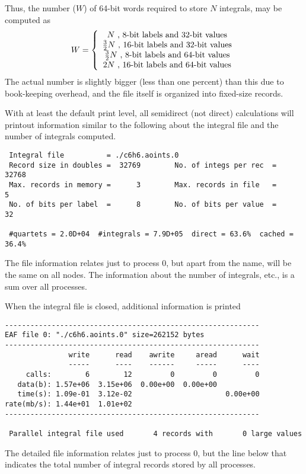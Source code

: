 Thus, the number ($W$) of 64-bit words required to store $N$ integrals,
may be computed as
\begin{displaymath}
  W = \left\{ \\
      \begin{array}{c}
        N \mbox{ , 8-bit labels and 32-bit values} \\
        \frac{3}{2}N \mbox{ , 16-bit labels and 32-bit values} \\
        \frac{3}{2}N \mbox{ , 8-bit labels and 64-bit values} \\
        2N \mbox{ , 16-bit labels and 64-bit values} 
      \end{array}
      \right.
\end{displaymath}
The actual number is slightly bigger (less than one percent) than this
due to book-keeping overhead, and the file itself is organized into
fixed-size records.

With at least the default print level, all semidirect (not direct)
calculations will printout information similar to the following about
the integral file and the number of integrals computed.
\begin{verbatim}
 Integral file          = ./c6h6.aoints.0
 Record size in doubles =  32769        No. of integs per rec  =  32768
 Max. records in memory =      3        Max. records in file   =      5
 No. of bits per label  =      8        No. of bits per value  =     32

 #quartets = 2.0D+04  #integrals = 7.9D+05  direct = 63.6%  cached = 36.4%
\end{verbatim}
The file information relates just to process 0, but apart from the
name, will be the same on all nodes.  The information about the number
of integrals, etc., is a sum over all processes.

When the integral file is closed, additional information is printed
\begin{verbatim}
------------------------------------------------------------
EAF file 0: "./c6h6.aoints.0" size=262152 bytes
------------------------------------------------------------
               write      read    awrite     aread      wait
               -----      ----    ------     -----      ----
     calls:        6        12         0         0         0
   data(b): 1.57e+06  3.15e+06  0.00e+00  0.00e+00
   time(s): 1.09e-01  3.12e-02                      0.00e+00
rate(mb/s): 1.44e+01  1.01e+02
------------------------------------------------------------

 Parallel integral file used       4 records with       0 large values
\end{verbatim}
The detailed file information relates just to process 0, but the 
line below that indicates the total number of integral records stored
by all processes.  

